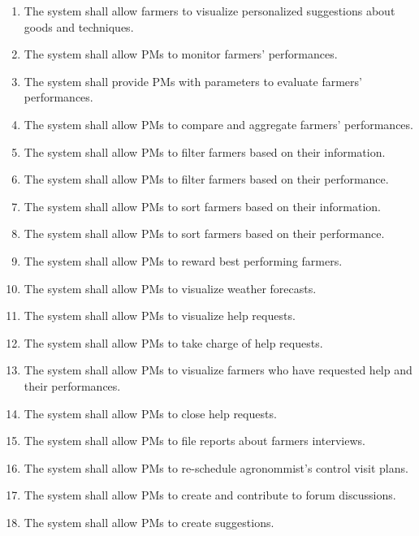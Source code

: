 \documentclass[10pt]{article}
\begin{document}
\begin{enumerate}[label=\textbf{R\arabic*}]
    \item \label{req:farmerSugg} The system shall allow farmers to visualize personalized suggestions about goods and techniques.    
    \item \label{req:pmMonitor} The system shall allow PMs to monitor farmers' performances.    
    \item \label{req:pmParameters} The system shall provide PMs with parameters to evaluate farmers' performances.   
    \item \label{req:pmGrades} The system shall allow PMs to compare and aggregate farmers' performances.    
    \item \label{req:pmFilter1} The system shall allow PMs to filter farmers based on their information.    
    \item \label{req:pmFilter2} The system shall allow PMs to filter farmers based on their performance.    
    \item \label{req:pmSort1} The system shall allow PMs to sort farmers based on their information.    
    \item \label{req:pmSort2} The system shall allow PMs to sort farmers based on their performance.     
    \item \label{req:pmRewards} The system shall allow PMs to reward best performing farmers.    
    \item \label{req:pmWeather} The system shall allow PMs to visualize weather forecasts.    
    \item \label{req:pmHelp1} The system shall allow PMs to visualize help requests.
    \item \label{req:pmHelp2} The system shall allow PMs to take charge of help requests.
    \item \label{req:pmHelp3} The system shall allow PMs to visualize farmers who have requested help and their performances.
    \item \label{req:pmHelp4} The system shall allow PMs to close help requests.
    \item \label{req:pmInterview} The system shall allow PMs to file reports about farmers interviews.    
    \item \label{req:pmVisits} The system shall allow PMs to re-schedule agronommist's control visit plans.    
    \item \label{req:pmForum} The system shall allow PMs to create and contribute to forum discussions.    
    \item \label{req:pmSuggestions} The system shall allow PMs to create suggestions.
\end{enumerate}
\end{document}
